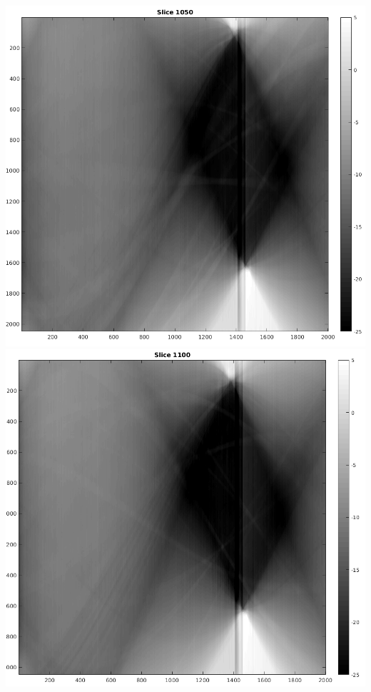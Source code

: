 \documentclass[10pt,a4paper,titlepage]{article}
\begin{document}
		\includegraphics[width=\textwidth]{sinograms/Slice1050.png}
		\includegraphics[width=\textwidth]{sinograms/Slice1100.png}
\end{document}

